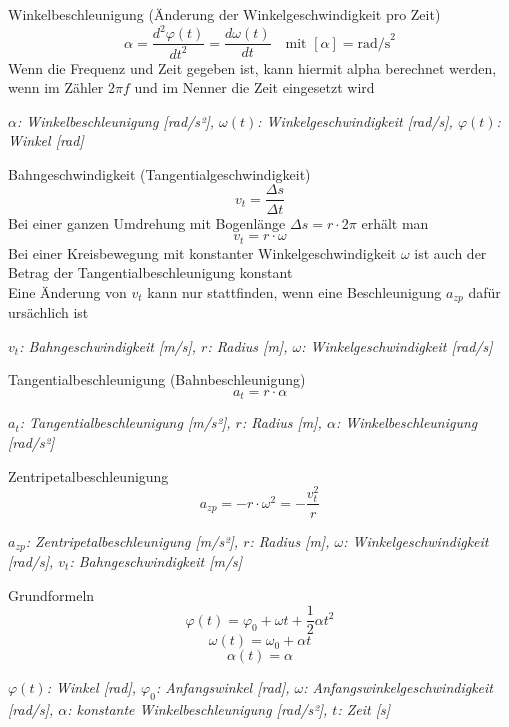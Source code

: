 \documentclass[a4paper,10pt]{article}
\newenvironment{displayformula}
{
	\begin{framed}
		\color{formulaColor}
	}
	{\end{framed}}
\newcommand{\formulalegend}[1]{%
	\par\vspace{0.5ex}%
	{{\color{legendColor}\RaggedRight\small\textit{#1}}}%
	\par\vspace{1.5ex}%
}
\begin{document}
\begin{displayformula}
	Winkelbeschleunigung (Änderung der Winkelgeschwindigkeit pro Zeit)
	\[
	\alpha = \frac{d^2 \varphi(t)}{dt^2} = \frac{d\omega(t)}{dt} \quad \text{mit } [\alpha] = \text{rad/s}^2
	\]
	Wenn die Frequenz und Zeit gegeben ist, kann hiermit alpha berechnet werden, wenn im Zähler $2 \pi f$ und im Nenner die Zeit eingesetzt wird
\end{displayformula}
\formulalegend{
	\( \alpha \): Winkelbeschleunigung [rad/s²], \( \omega(t) \): Winkelgeschwindigkeit [rad/s], \( \varphi(t) \): Winkel [rad]
}

\begin{displayformula}
	Bahngeschwindigkeit (Tangentialgeschwindigkeit)
	\[
	v_t = \frac{\Delta s}{\Delta t}
	\]
	Bei einer ganzen Umdrehung mit Bogenlänge $\Delta s = r \cdot 2 \pi$ erhält man
	\[
	v_t = r \cdot \omega
	\]
	Bei einer Kreisbewegung mit konstanter Winkelgeschwindigkeit $\omega$ ist auch der Betrag der Tangentialbeschleunigung konstant \\
	Eine Änderung von $v_t$ kann nur stattfinden, wenn eine Beschleunigung $a_{zp}$ dafür ursächlich ist
\end{displayformula}
\formulalegend{
	\( v_t \): Bahngeschwindigkeit [m/s], \( r \): Radius [m], \( \omega \): Winkelgeschwindigkeit [rad/s]
}

\begin{displayformula}
	Tangentialbeschleunigung (Bahnbeschleunigung)
	\[
	a_t = r \cdot \alpha
	\]
\end{displayformula}
\formulalegend{
	\( a_t \): Tangentialbeschleunigung [m/s²], \( r \): Radius [m], \( \alpha \): Winkelbeschleunigung [rad/s²]
}

\begin{displayformula}
	Zentripetalbeschleunigung
	\[
	a_{zp} = -r \cdot \omega^2 = - \frac{v_t^2}{r}
	\]
\end{displayformula}
\formulalegend{
	\( a_{zp} \): Zentripetalbeschleunigung [m/s²], \( r \): Radius [m], \( \omega \): Winkelgeschwindigkeit [rad/s], \( v_t \): Bahngeschwindigkeit [m/s]
}

\begin{displayformula}
	Grundformeln
	\[
	\varphi (t) = \varphi_0 + \omega t + \frac{1}{2} \alpha t^2
	\]
	\[
	\omega (t) = \omega_0 + \alpha t
	\]
	\[
	\alpha (t) = \alpha
	\]
\end{displayformula}
\formulalegend{
	\( \varphi(t) \): Winkel [rad], \( \varphi_0 \): Anfangswinkel [rad], \( \omega \): Anfangswinkelgeschwindigkeit [rad/s], \( \alpha \): konstante Winkelbeschleunigung [rad/s²], \( t \): Zeit [s]
}
\end{document}
